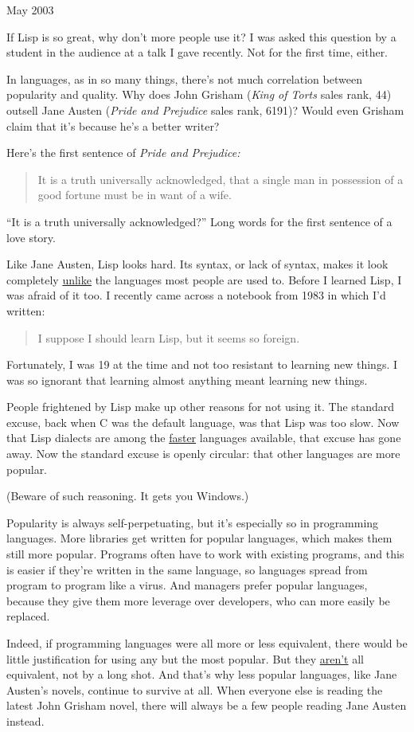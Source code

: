 May 2003

If Lisp is so great, why don't more people use it? I was asked this
question by a student in the audience at a talk I gave recently. Not for
the first time, either.

In languages, as in so many things, there's not much correlation between
popularity and quality. Why does John Grisham (\emph{King of Torts}
sales rank, 44) outsell Jane Austen (\emph{Pride and Prejudice} sales
rank, 6191)? Would even Grisham claim that it's because he's a better
writer?

Here's the first sentence of \emph{Pride and Prejudice:}

\begin{quote}
It is a truth universally acknowledged, that a single man in possession
of a good fortune must be in want of a wife.
\end{quote}

``It is a truth universally acknowledged?'' Long words for the first
sentence of a love story.

Like Jane Austen, Lisp looks hard. Its syntax, or lack of syntax, makes
it look completely
\href{https://sep.turbifycdn.com/ty/cdn/paulgraham/acl2.lisp?t=1688221954&}{unlike}
the languages most people are used to. Before I learned Lisp, I was
afraid of it too. I recently came across a notebook from 1983 in which
I'd written:

\begin{quote}
I suppose I should learn Lisp, but it seems so foreign.
\end{quote}

Fortunately, I was 19 at the time and not too resistant to learning new
things. I was so ignorant that learning almost anything meant learning
new things.

People frightened by Lisp make up other reasons for not using it. The
standard excuse, back when C was the default language, was that Lisp was
too slow. Now that Lisp dialects are among the
\href{http://shootout.alioth.debian.org/benchmark.php?test=nestedloop&lang=all&sort=cpu}{faster}
languages available, that excuse has gone away. Now the standard excuse
is openly circular: that other languages are more popular.

(Beware of such reasoning. It gets you Windows.)

Popularity is always self-perpetuating, but it's especially so in
programming languages. More libraries get written for popular languages,
which makes them still more popular. Programs often have to work with
existing programs, and this is easier if they're written in the same
language, so languages spread from program to program like a virus. And
managers prefer popular languages, because they give them more leverage
over developers, who can more easily be replaced.

Indeed, if programming languages were all more or less equivalent, there
would be little justification for using any but the most popular. But
they \href{icad.html}{aren't} all equivalent, not by a long shot. And
that's why less popular languages, like Jane Austen's novels, continue
to survive at all. When everyone else is reading the latest John Grisham
novel, there will always be a few people reading Jane Austen instead.
